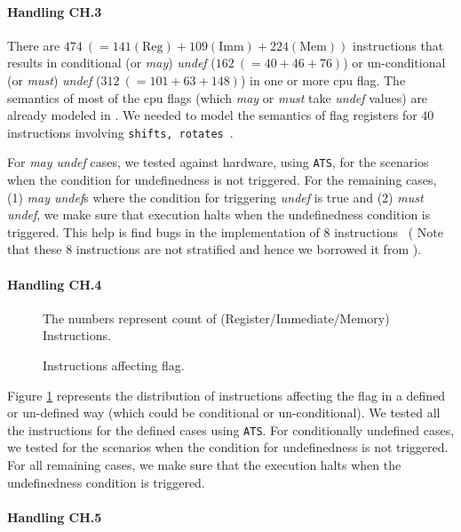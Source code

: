     \paragraph{Handling CH.3} There are $474\ (= 141(\text{Reg}) +
        109(\text{Imm}) + 224(\text{Mem}))$ instructions that results in
    conditional  (or \emph{may}) \emph{undef} ($162\ (= 40 + 46 + 76)$) or
    un-conditional (or \emph{must}) \emph{undef} ($312\ (= 101 + 63 + 148)$)  in
    one or more cpu flag.  The semantics of most of the cpu flags (which
        \emph{may} or \emph{must} take \emph{undef} values) are already modeled
    in \Stoke. We needed to model the semantics of flag registers for $40$
    instructions involving {\tt shifts, rotates}~\cite{BugStoke986}. 
    
    For \emph{may undef} cases, we tested against hardware, using {\tt ATS}, for
    the scenarios when the condition for undefinedness is not triggered.  For
    the remaining cases, (1) \emph{may undef}s where the condition for
    triggering \emph{undef} is true and (2) \emph{must undef}, we make sure that
    \K execution halts when the undefinedness condition is triggered. This help
    is find bugs in the \Stoke implementation of $8$
    instructions~\cite{BugStoke986} ( Note that these $8$ instructions are not
        stratified and hence we borrowed it from \Stoke).   
    
    
   \paragraph{Handling CH.4}
   \begin{figure}[t]
       \centering
       \caption{Instructions affecting  flag.} The numbers represent count of (Register/Immediate/Memory) Instructions. 
       \label{fig:AD}
   \end{figure}

   Figure \ref{fig:AD} represents the distribution of instructions affecting the
    flag in a defined or un-defined way (which could be conditional or
       un-conditional).  We tested all the instructions for the defined cases
   using {\tt ATS}. For conditionally undefined cases, we tested for the
   scenarios when the condition for undefinedness is not triggered.  For all
   remaining cases,  we make sure that the \K execution halts when the
   undefinedness condition is triggered.        
   
   \paragraph{Handling CH.5}
   
